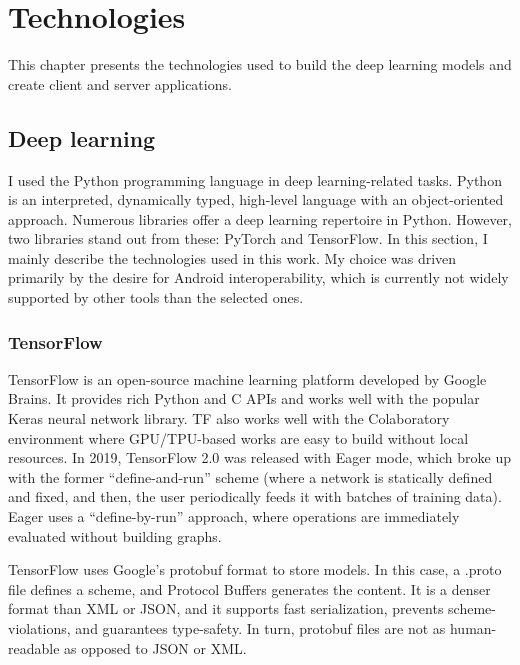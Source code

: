\chapter{Technologies}

This chapter presents the technologies used to build the deep learning models and create client and server applications.

\section{Deep learning}

I used the Python\cite{Python} programming language in deep learning-related tasks. Python is an interpreted, dynamically typed, high-level language with an object-oriented approach. Numerous libraries offer a deep learning repertoire in Python. However, two libraries stand out from these: PyTorch and TensorFlow. In this section, I mainly describe the technologies used in this work. My choice was driven primarily by the desire for Android interoperability, which is currently not widely supported by other tools than the selected ones.

\subsection{TensorFlow}

TensorFlow\cite{TensorFlow} is an open-source machine learning platform developed by Google Brains. It provides rich Python and C APIs and works well with the popular Keras neural network library. TF also works well with the Colaboratory environment where GPU/TPU-based works are easy to build without local resources. In 2019, TensorFlow 2.0 was released with Eager mode, which broke up with the former ``define-and-run'' scheme (where a network is statically defined and fixed, and then, the user periodically feeds it with batches of training data). Eager uses a ``define-by-run'' approach\cite{TensorFlowEager}, where operations are immediately evaluated without building graphs.

TensorFlow uses Google's protobuf\cite{Protobuf} format to store models. In this case, a .proto file defines a scheme, and Protocol Buffers generates the content. It is a denser format than XML or JSON, and it supports fast serialization, prevents scheme-violations, and guarantees type-safety\cite{ProtobufVsFlatbuf}. In turn, protobuf files are not as human-readable as opposed to JSON or XML.

